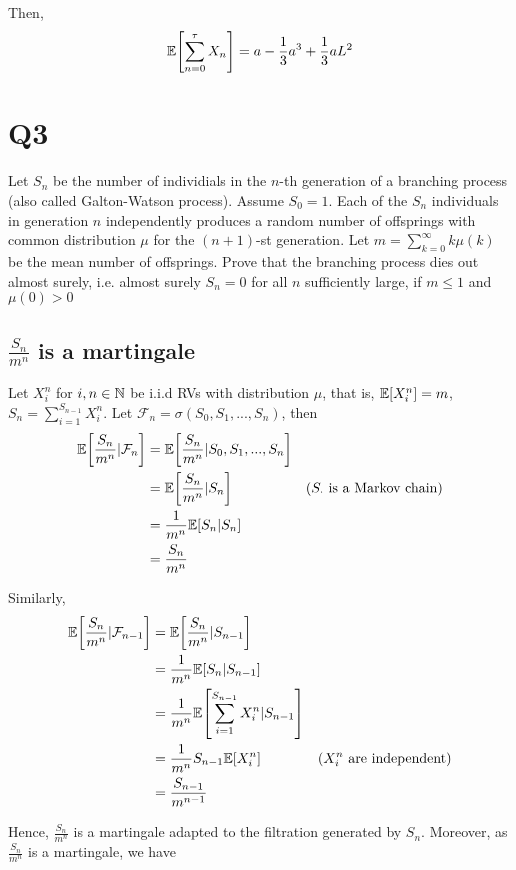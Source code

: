 \documentclass{article}
\begin{document}
Then, 
$$
	\Exp\bracket*{\sum_{n=0}^\tau X_n} = a - \frac{1}{3} a^3 + \frac{1}{3} aL^2
$$

\section{Q3}

Let $S_n$ be the number of individials in the $n$-th generation of a branching process (also called Galton-Watson process). Assume $S_0 = 1$. Each of the $S_n$ individuals in generation $n$ independently produces a random number of offsprings with common distribution $\mu$ for the $(n+1)$-st generation. Let $m = \sum_{k=0}^\infty k \mu(k)$ be the mean number of offsprings. Prove that the branching process dies out almost surely,  i.e. almost surely $S_n = 0$ for all $n$ sufficiently large, if $m \leq 1$ and $\mu(0) > 0$

\subsection{$\frac{S_n}{m^n}$ is a martingale}

Let $X_i^n$ for $i, n \in \mathbb{N}$ be i.i.d RVs with distribution $\mu$, that is, $\mathbb{E}[X_i^n] = m$, $S_n = \sum_{i=1}^{S_{n-1}} X_i^n$. Let $\mathcal{F}_n = \sigma(S_0, S_1, ..., S_n)$, then
\begin{align*}
	\Exp\bracket*{\frac{S_n}{m^n} | \mathcal{F}_n}
	&= \Exp\bracket*{\frac{S_n}{m^n} | S_0, S_1, ..., S_n} \\
	&= \Exp\bracket*{\frac{S_n}{m^n} | S_n} &\text{($S_\cdot$ is a Markov chain)}\\
	&= \frac{1}{m^n} \Exp\bracket*{S_n | S_n} \\
	&= \frac{S_n}{m^n}
\end{align*}

Similarly, 
\begin{align*}
	\Exp\bracket*{\frac{S_n}{m^n} | \mathcal{F}_{n-1}}
	&= \Exp\bracket*{\frac{S_n}{m^n} | S_{n-1}} \\
	&= \frac{1}{m^n} \Exp[S_n | S_{n-1}] \\
	&= \frac{1}{m^n} \Exp\bracket*{\sum_{i=1}^{S_{n-1}} X_i^n | S_{n-1}} \\
	&= \frac{1}{m^n} S_{n-1} \Exp[X_i^n] &\text{($X_i^n$ are independent)} \\
	&= \frac{S_{n-1}}{m^{n-1}}
\end{align*}

Hence, $\frac{S_n}{m^n}$ is a martingale adapted to the filtration generated by $S_n$. Moreover, as $\frac{S_n}{m^n}$ is a martingale, we have
\end{document}
